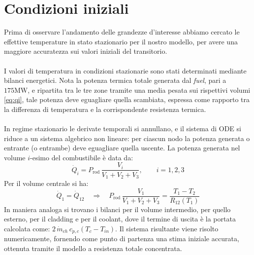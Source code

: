 \documentclass[12pt]{report}
\begin{document}
\section{Condizioni iniziali}
\label {sec: steadystate}
Prima di osservare l'andamento delle grandezze d'interesse abbiamo cercato le effettive temperature in stato stazionario per il nostro modello, per avere una maggiore accuratezza sui valori iniziali del transitorio.\\ \\I valori di temperatura in condizioni stazionarie sono stati determinati mediante bilanci energetici. Nota la potenza termica totale generata dal \textit{fuel}, pari a $175 \text{MW}$, e ripartita tra le tre zone tramite una media pesata sui rispettivi volumi \eqref{eq:qi}, tale potenza deve eguagliare quella scambiata, espressa come rapporto tra la differenza di temperatura e la corrispondente resistenza termica.\\\\
In regime stazionario le derivate temporali si annullano, e il sistema di ODE si riduce a un sistema algebrico non lineare: per ciascun nodo la potenza generata o entrante (o entrambe) deve eguagliare quella uscente. La potenza generata nel volume $i$-esimo del combustibile è data da:
\begin{equation}
    \dot{Q}_i = P_\text{rod}\,\frac{V_i}{V_1+V_2+V_3}, \qquad i=1,2,3
    \label{eq:qi}
\end{equation}
Per il volume centrale si ha:
\begin{equation}
    \dot{Q}_1 = \dot{Q}_{12} \quad\Longrightarrow\quad
    P_\text{rod}\,\frac{V_1}{V_1+V_2+V_3} = \frac{T_1 - T_2}{R_{12}(T_1)}
    \label{eq:ss_nodo1}
\end{equation}
In maniera analoga si trovano i bilanci per il volume intermedio, per quello esterno, per il cladding e per il coolant, dove il termine di uscita è la portata calcolata come: 
$2\,\dot{m}_{ch}\,c_{p,c}(T_c - T_{in})$. Il sistema risultante viene risolto numericamente, fornendo come punto di partenza una stima iniziale accurata, ottenuta tramite il modello a resistenza totale concentrata.
\end{document}
